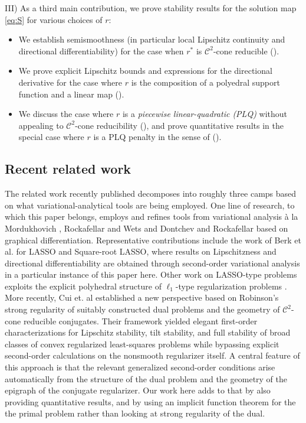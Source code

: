 \documentclass[reqno]{amsart}
\numberwithin{equation}{section}
\begin{document}
\noindent
III) As a third main contribution, we prove stability results for the solution map \eqref{eq:S} for various choices of $r$: 
\begin{itemize}
\item[i)] We establish semismoothness (in particular local Lipschitz continuity and directional differentiability) for the case when $r^*$ is $\mathcal{C}^2$-cone reducible ().
\item[ii)] We prove explicit Lipschitz bounds and expressions for the directional derivative for the case where $r$ is the composition of a polyedral support function and a linear map ().

\item[iii)] We discuss the case where $r$ is a {\em piecewise linear-quadratic (PLQ)} without appealing to $\mathcal{C}^2$-cone reducibility (),   and prove quantitative results in the special  case where $r$ is a PLQ penalty in the sense of \cite[Example 11.18]{RoW 98} ().

\end{itemize}





\subsection{Recent related work}\label{sec:RelWork} The related work recently published decomposes into  roughly three camps based on what variational-analytical tools are being employed.  One line of research, to which this paper belongs,  employs and refines  tools from variational analysis \`a la Mordukhovich \cite{Mor 06, Mor 18},  Rockafellar and Wets \cite{RoW 98} and Dontchev and Rockafellar \cite{DoR 14} based on graphical differentiation.  Representative contributions include the work of Berk et al. \cite{BBH 22, BBH 24} for LASSO and Square-root LASSO,  where results on  Lipschitzness and directional differentiability   are obtained through second-order variational analysis in a particular instance of this paper here. Other work on LASSO-type problems exploits the explicit polyhedral structure of $\ell_1$-type regularization problems \cite{HYZ 24, MWY 25}.  More recently, Cui et. al \cite{CHNS 26} established a new perspective based on Robinson's strong regularity of suitably constructed dual problems and the geometry of $\mathcal{C}^2$-cone reducible conjugates. Their framework yielded elegant first-order characterizations for Lipschitz stability, tilt stability, and full stability of broad classes of convex regularized least-squares problems while bypassing explicit second-order calculations on the nonsmooth regularizer itself. A central feature of this approach is that the relevant generalized second-order conditions arise automatically from the structure of the dual problem and the geometry of the epigraph of the conjugate regularizer. Our work here adds to that by also providing quantitative results, and by using an implicit function theorem for the the primal problem rather than looking at strong regularity of the dual. 
\end{document}
